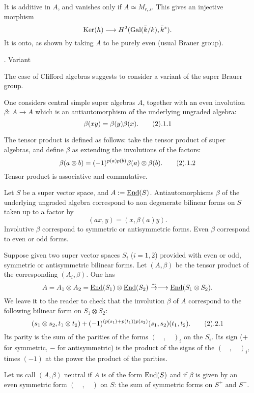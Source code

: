 It is additive in $A$, and vanishes only if $A\simeq
M_{r,s}$.
This gives an injective morphism
$$
\text{\rm Ker}(h)\longrightarrow H^2(\text{\rm Gal}(\bar{k}/k),\bar{k}^*).
$$
It is onto, as shown by taking $A$ to be purely even
(usual Brauer group).

\newpage

. Variant
\endsubhead

The case of Clifford algebras suggests to consider a
variant of the super Brauer group.

\endsubhead
One considers central simple super algebras $A$,
together with an even involution $\beta\colon\,A\to A$
which is an antiautomorphism of the underlying ungraded
algebra:
$$
\beta(xy)=\beta(y)\beta(x).\tag2.1.1
$$

The tensor product is defined as follows:
take the tensor product of super algebras, and define
$\beta$ as extending the involutions of the factors:
$$
\beta(a\otimes b)=(-1)^{p(a)p(b)}\beta(a)
\otimes\beta(b).
\tag2.1.2
$$
Tensor product is associative and commutative.

Let $S$ be a super vector space, and
$A:=\underline{\text{\rm End}}(S)$.
Antiautomorphisms $\beta$ of the underlying ungraded
algebra correspond to non degenerate bilinear forms on
$S$ taken up to a factor by
$$
(ax,y)=(x,\beta(a)y).
$$
Involutive $\beta$ correspond to symmetric or
antisymmetric forms.
Even $\beta$ correspond to even or odd forms.
\endexample

 Suppose given two super vector spaces $S_i$ ($i=1,2$)
provided with even or odd, symmetric or antisymmetric
bilinear forms.
Let $(A,\beta)$ be the tensor product of the
corresponding $(A_i,\beta)$.
One has
$$
A=A_1\otimes A_2=\underline{\text{\rm End}}(S_1)\otimes
\underline{\text{\rm End}}(S_2)\overset\sim\to\longrightarrow
\underline{\text{\rm End}}(S_1\otimes S_2).
$$
We leave it to the reader to check that the involution
$\beta$ of $A$ correspond to the following bilinear
form on $S_1\otimes S_2$:
$$
(s_1\otimes s_2,t_1\otimes t_2)+(-1)^{(p(s_1)+p(t_1))p(s_2)}
(s_1,s_2)(t_1,t_2).
\tag2.2.1
$$
Its parity is the sum of the parities of the forms
$(\quad,\quad)_i$ on the $S_i$.
Its sign ($+$ for symmetric, $-$ for antisymmetric) is
the product of the signs of the $(\quad,\quad)_i$, times
$(-1)$ at the power the product of the parities.

\endsubhead
Let us call $(A,\beta)$ neutral if $A$ is of the form
$\text{\rm End}(S)$ and if $\beta$ is given by an even symmetric
form $(\quad,\quad)$ on $S$: the sum of symmetric forms
on $S^+$ and $S^-$.


